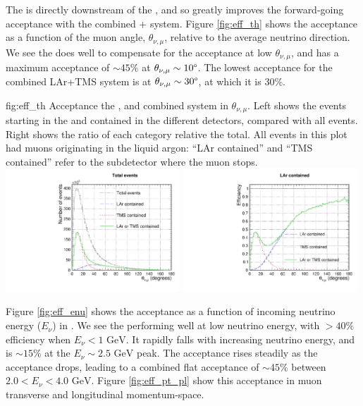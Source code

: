 The  is directly downstream of the , and so greatly improves the forward-going acceptance with the combined + system. Figure \ref{fig:eff_th} shows the acceptance as a function of the muon angle, $\theta_{\nu,\mu}$, relative to the average neutrino direction. We see the  does well to compensate for the  acceptance at low $\theta_{\nu,\mu}$, and has a maximum acceptance of $\sim45\%$ at $\theta_{\nu,\mu}\sim10\degree$. The lowest acceptance for the combined LAr+TMS system is at $\theta_{\nu,\mu}\sim 30\degree$, at which it is 30\%.
\begin{dunefigure}{fig:eff_th}
{Acceptance the ,  and combined system in $\theta_{\nu,\mu}$. Left shows the events starting in the  and contained in the different detectors, compared with all events. Right shows the ratio of each category relative the total. All events in this plot had muons originating in the liquid argon: ``LAr contained'' and ``TMS contained'' refer to the subdetector where the muon stops.}
\includegraphics[width=0.49\textwidth, clip, trim={0mm 0mm 0mm 10mm}]{graphics/tms/Simulation/Efficiency/eff_theta.pdf} \includegraphics[width=0.49\textwidth, clip, trim={0mm 0mm 0mm 10mm}]{graphics/tms/Simulation/Efficiency/eff_theta_ratio.pdf}
\end{dunefigure}

Figure \ref{fig:eff_enu} shows the acceptance as a function of incoming neutrino energy ($E_\nu$) in . We see the  performing well at low neutrino energy, with $>40\%$ efficiency when $E_\nu < 1 \text{ GeV}$. It rapidly falls with increasing neutrino energy, and is $\sim15\%$ at the $E_\nu\sim 2.5\text{ GeV}$ peak. The  acceptance rises steadily as the  acceptance drops, leading to a combined flat acceptance of $\sim45\%$ between $2.0<E_\nu<4.0\text{ GeV}$. Figure \ref{fig:eff_pt_pl} show this acceptance in muon transverse and longitudinal momentum-space.

